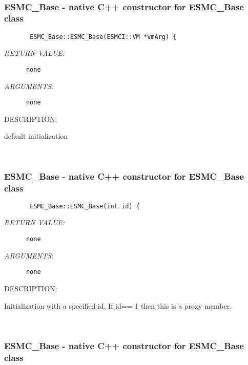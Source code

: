  
\mbox{}\hrulefill\
 
\subsubsection [ESMC\_Base] {ESMC\_Base - native C++ constructor for ESMC\_Base class}


  
\begin{verbatim}       ESMC_Base::ESMC_Base(ESMCI::VM *vmArg) {\end{verbatim}{\em RETURN VALUE:}
\begin{verbatim}      none\end{verbatim}{\em ARGUMENTS:}
\begin{verbatim}      none\end{verbatim}
{\sf DESCRIPTION:\\ }


     default initialization
   
 
\mbox{}\hrulefill\
 
\subsubsection [ESMC\_Base] {ESMC\_Base - native C++ constructor for ESMC\_Base class}


  
\begin{verbatim}       ESMC_Base::ESMC_Base(int id) {\end{verbatim}{\em RETURN VALUE:}
\begin{verbatim}      none\end{verbatim}{\em ARGUMENTS:}
\begin{verbatim}      none\end{verbatim}
{\sf DESCRIPTION:\\ }


     Initialization with a specified id. If id==-1 then this is a proxy member.
   
 
\mbox{}\hrulefill\
 
\subsubsection [ESMC\_Base] {ESMC\_Base - native C++ constructor for ESMC\_Base class}


